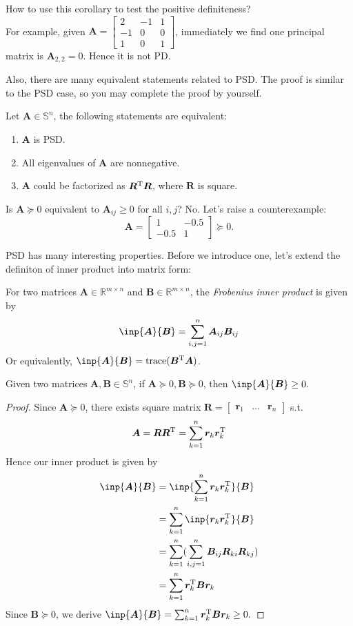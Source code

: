 How to use this corollary to test the positive definiteness?\\
For example, given $\bm A=\begin{bmatrix}
2&-1&1\\-1&0&0\\1&0&1
\end{bmatrix}$, immediately we find one principal matrix is $\bm A_{2,2}=0.$ Hence it is not PD.

Also, there are many equivalent statements related to PSD. The proof is similar to the PSD case, so you may complete the proof by yourself.
\begin{theorem}
Let $\bm A\in\mathbb{S}^n$, the following statements are equivalent:
\begin{enumerate}
\item
$\bm A$ is PSD.
\item
All eigenvalues of $\bm A$ are nonnegative.
\item
$\bm A$ could be factorized as $\bm R^{\mathrm T}\bm R$, where $\bm R$ is square.
\end{enumerate}
\end{theorem}
\begin{remark}
Is $\bm A\succeq0$ equivalent to $\bm A_{ij}\ge0$ for all $i,j$? No. Let's raise a counterexample:
\[
\bm A=\begin{bmatrix}
1&-0.5\\-0.5&1
\end{bmatrix}\succeq0.
\]
\end{remark}

PSD has many interesting properties. Before we introduce one, let's extend the definiton of inner product into matrix form:
\begin{definition}
For two matrices $\bm A\in\mathbb{R}^{m\times n}$ and $\bm B\in\mathbb{R}^{m\times n}$, the \emph{Frobenius inner product} is given by
\[
\inp{\bm A}{\bm B}=\sum_{i,j=1}^{n}\bm A_{ij}\bm B_{ij}
\]
Or equivalently, $\inp{\bm A}{\bm B}=\trace(\bm B\trans\bm A)$.
\end{definition}
\begin{proposition}
Given two matrices $\bm A,\bm B\in\mathbb{S}^n$, if $\bm A\succeq0,\bm B\succeq0$, then $\inp{\bm A}{\bm B}\ge0.$
\end{proposition}
\begin{proof}
Since $\bm A\succeq0$, there exists square matrix $\bm R=\begin{bmatrix}
\bm r_1&\dots&\bm r_n
\end{bmatrix}$ s.t.
\[
\bm A=\bm R\bm R^{\mathrm T}=\sum_{k=1}^{n}\bm r_k\bm r_k^{\mathrm T}
\]
Hence our inner product is given by
\begin{align*}
\inp{\bm A}{\bm B}&=\inp{\sum_{k=1}^{n}\bm r_k\bm r_k\trans}{\bm B}\\
&=\sum_{k=1}^{n}\inp{\bm r_k\bm r_k\trans}{\bm B}\\
&=\sum_{k=1}^{n}(\sum_{i,j=1}^{n}\bm B_{ij}\bm R_{ki}\bm R_{kj})\\
&=\sum_{k=1}^{n}\bm r_k\trans\bm B\bm r_k
\end{align*}
Since $\bm B\succeq0$, we derive $\inp{\bm A}{\bm B}=\sum_{k=1}^{n}\bm r_k\trans\bm B\bm r_k\ge0.$
\end{proof}